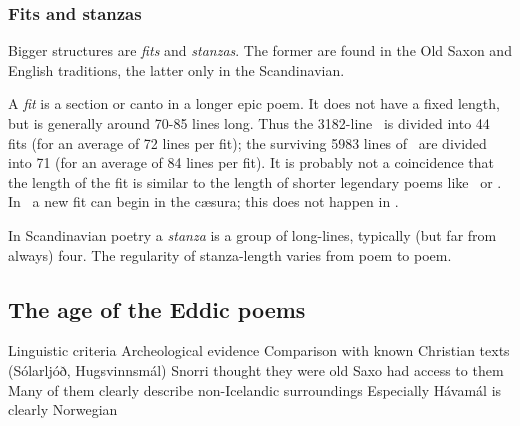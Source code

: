    \subsubsection{Fits and stanzas}
    Bigger structures are \emph{fits} and \emph{stanzas}.  The former are found in the Old Saxon and English traditions, the latter only in the Scandinavian.

    A \emph{fit} is a section or canto in a longer epic poem.  It does not have a fixed length, but is generally around 70-85 lines long.  Thus the 3182-line \Beowulf\ is divided into 44 fits (for an average of 72 lines per fit); the surviving 5983 lines of \Heliand\ are divided into 71 (for an average of 84 lines per fit).  It is probably not a coincidence that the length of the fit is similar to the length of shorter legendary poems like \GudrunOne\ or \Hildebrandslied.  In \Heliand\ a new fit can begin in the cæsura; this does not happen in \Beowulf.

    In Scandinavian poetry a \emph{stanza} is a group of long-lines, typically (but far from always) four.  The regularity of stanza-length varies from poem to poem.


  \subsection{The age of the Eddic poems}%
    Linguistic criteria
    Archeological evidence
    Comparison with known Christian texts (Sólarljóð, Hugsvinnsmál)
    Snorri thought they were old
    Saxo had access to them
    Many of them clearly describe non-Icelandic surroundings
      Especially Hávamál is clearly Norwegian


